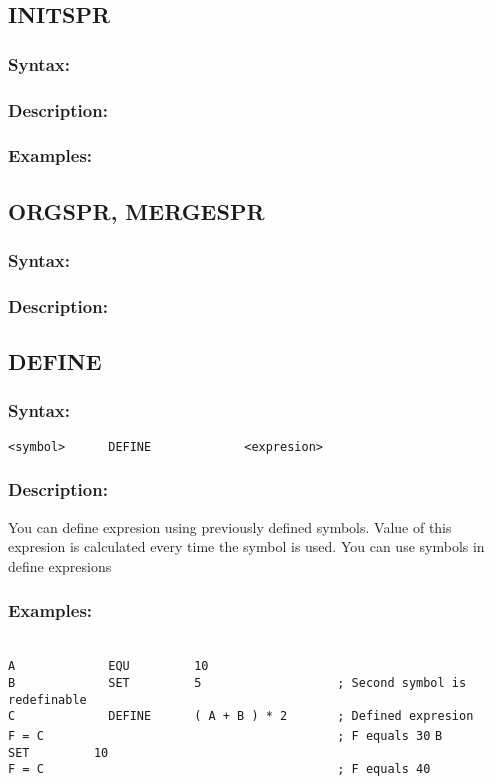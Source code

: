     \subsection{INITSPR}
        \subsubsection{Syntax:}

        \subsubsection{Description:}
 
        \subsubsection{Examples:}


    \subsection{ORGSPR, MERGESPR}
        \subsubsection{Syntax:}

        \subsubsection{Description:}

    \subsection{DEFINE}
        \subsubsection{Syntax:}
            \verb'<symbol>      DEFINE             <expresion>'

        \subsubsection{Description:}
        You can define expresion using previously defined symbols. Value of this expresion is calculated every time the symbol is used. You can use symbols in define expresions

        \subsubsection{Examples:}
        {
            ~\\
            \usecodefont
            \verb'A             EQU         10'\\
            \verb'B             SET         5                   ; Second symbol is redefinable'\\
            \verb'C             DEFINE      ( A + B ) * 2       ; Defined expresion'\\
            \verb'F = C                                         ; F equals 30'
            \verb'B             SET         10'\\
            \verb'F = C                                         ; F equals 40'
        }

